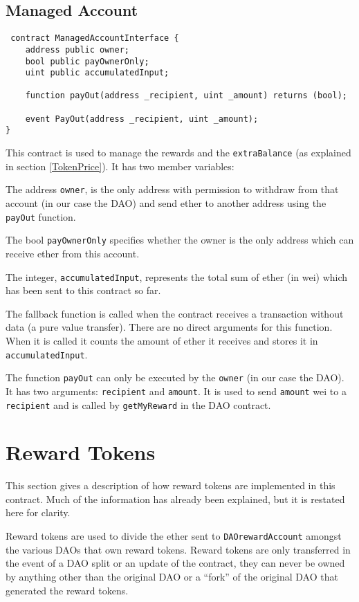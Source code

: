 \documentclass[9pt,oneside]{amsart}
\begin{document}
\subsection{Managed Account}
\begin{verbatim}
 contract ManagedAccountInterface {
    address public owner;
    bool public payOwnerOnly;
    uint public accumulatedInput;

    function payOut(address _recipient, uint _amount) returns (bool);

    event PayOut(address _recipient, uint _amount);
}
\end{verbatim}
\begin{multicols}{2}
This contract is used to manage the rewards and the \verb|extraBalance| (as explained in section \ref{TokenPrice}). It has two member variables:

The address \verb|owner|, is the only address with permission to withdraw from that account (in our case the DAO) and send ether to another address using the \verb|payOut| function.

The bool \verb|payOwnerOnly| specifies whether the owner is the only address which can receive ether from this account.

The integer, \verb|accumulatedInput|, represents the total sum of ether (in wei) which has been sent to this contract so far.

The fallback function is called when the contract receives a transaction without data (a pure value transfer). There are no direct arguments for this function. When it is called it counts the amount of ether it receives and stores it in \verb|accumulatedInput|.

The function \verb|payOut| can only be executed by the \verb|owner| (in our case the DAO). It has two arguments: \verb|recipient| and \verb|amount|. It is used to send \verb|amount| wei to a \verb|recipient| and is called by \verb|getMyReward| in the DAO contract.

\section{Reward Tokens} \label{RewardToken}

This section gives a description of how reward tokens are implemented in this contract. Much of the information has already been explained, but it is restated here for clarity. 

Reward tokens are used to divide the ether sent to \verb|DAOrewardAccount| amongst the various DAOs that own reward tokens. Reward tokens are only transferred in the event of a DAO split or an update of the contract, they can never be owned by anything other than the original DAO or a “fork” of the original DAO that generated the reward tokens. 


\end{multicols}
\end{document}
